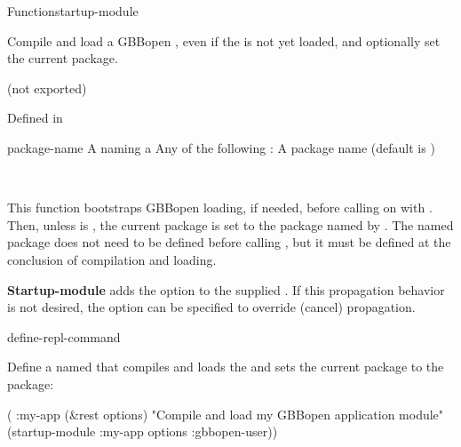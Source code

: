 \documentclass[10pt,twoside,english,pdftex]{article}
\begin{document}
\begin{functiondoc}{Function}{startup-module}%
  { 
    }
%
% 
%
%
%
%
%

\fnsyntax 

\fnpurpose Compile and load a GBBopen , even if the
 is not yet loaded, and
optionally set the current package.

\fnpackage {} (not exported)

\fnmodule Defined in 

\fnargs
\begin{args}{package-name}
 A  naming a 
\arg[option] Any of the following : 
\compilemoduleoptions
{} A package name (default is \nil)
\end{args}

\fnerrors
\modulenotdefined\\
\relativedircircularity

\fndescription This function bootstraps GBBopen loading, if needed, before
calling  on
 with .  Then, unless
 is \nil, the current package is set to the package
named by .  The named package does not need to be
defined before calling , but it must be defined
at the conclusion of  compilation and loading.

%
%
%
\textbf{Startup-module} adds the option  to the
supplied .  If this propagation behavior is not desired,
the  option can be specified to override (cancel)
propagation.

\begin{alsos}{define-repl-command}
\end{alsos}

\fnexample
%
Define a  named  that compiles and
loads the   and sets the current package to
the  package:
%
\W\supp
\begin{example}
  ( :my-app (&rest options)
    "Compile and load my GBBopen application module"
    (startup-module :my-app options :gbbopen-user))
\end{example} 

\end{functiondoc}
\end{document}

